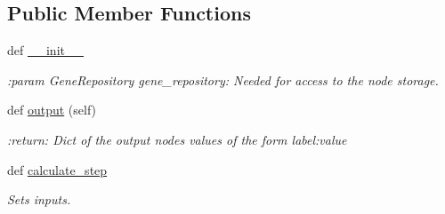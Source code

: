 \subsection*{Public Member Functions}
\begin{DoxyCompactItemize}
\item 
def \hyperlink{classNEAT__PyGenetics_1_1NEAT_1_1GenomeStructures_1_1SimulationStructure_1_1SimulationGenome_1_1SimulationGenome_a9e3d21a710e6b90ca8d6332fbdc8faa2}{\+\_\+\+\_\+init\+\_\+\+\_\+}
\begin{DoxyCompactList}\small\item\em \+:param Gene\+Repository gene\+\_\+repository\+: Needed for access to the node storage. \end{DoxyCompactList}\item 
def \hyperlink{classNEAT__PyGenetics_1_1NEAT_1_1GenomeStructures_1_1SimulationStructure_1_1SimulationGenome_1_1SimulationGenome_af8bbfbec0e15a55d7a889ba9859f034a}{output} (self)
\begin{DoxyCompactList}\small\item\em \+:return\+: Dict of the output nodes\textquotesingle{} values of the form label\+:value \end{DoxyCompactList}\item 
def \hyperlink{classNEAT__PyGenetics_1_1NEAT_1_1GenomeStructures_1_1SimulationStructure_1_1SimulationGenome_1_1SimulationGenome_ae35fc2d42a8f79cf1cf7cf65b40910b6}{calculate\+\_\+step}
\begin{DoxyCompactList}\small\item\em Sets inputs. \end{DoxyCompactList}\end{DoxyCompactItemize}
